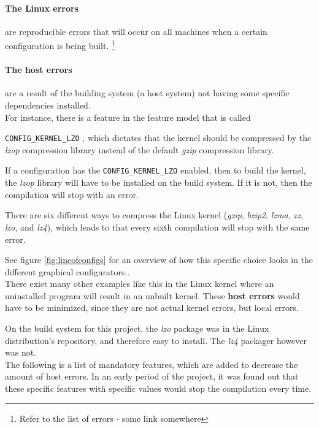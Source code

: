 \documentclass[a4paper,11pt]{report}
\newcommand{\textcode}[1]{
    \fboxsep=1pt
    \texttt{\colorbox{gray!20}{#1}}
}
\begin{document}
    \paragraph{The Linux errors} 
are reproducible errors that will occur on all 
machines when a certain configuration is being built. 
    \footnote{Refer to the list of errors - some link somewhere}

    \paragraph{The host errors} 
are a result of the building system (a host system) not having some specific 
dependencies installed.
\\

For instance, there is a feature in the feature model that is called 
\textcode{CONFIG\_KERNEL\_LZO}, which dictates that the kernel should be 
compressed by the \emph{lzop} compression library instead of the default 
\emph{gzip} compression library.

If a configuration has the \textcode{CONFIG\_KERNEL\_LZO} enabled, then to 
build the kernel, the \emph{lzop} library will have to be installed on the 
build system. If it is not, then the compilation will stop with an error.

There are six different ways to compress the Linux kernel (\emph{gzip}, 
\emph{bzip2}, \emph{lzma}, \emph{xz}, \emph{lzo}, and \emph{lz4}),
which leads to that every sixth compilation will stop with the same error.

See figure \ref{fig:lineofconfigs} for an overview of how this specific choice
looks in the different graphical configurators..
\\

There exist many other examples like this in the Linux kernel where an 
uninstalled program will result in an unbuilt kernel. These \textbf{host 
errors} would have to be minimized, since they are not actual kernel errors, 
but local errors. 

On the build system for this project, the \emph{lzo} package was in the Linux 
distribution's repository, and therefore easy to install. The \emph{lz4} 
packager however was not.
\\

The following is a list of mandatory features, which are added to decrease the 
amount of host errors. In an early period of the project, it was found out that 
these specific features with specific values would stop the compilation every 
time.
\end{document}
